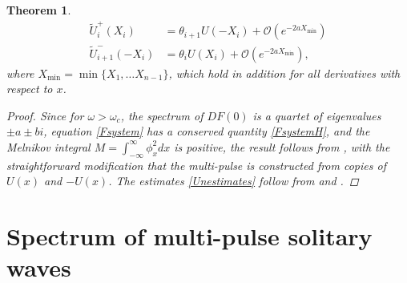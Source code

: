 \documentclass[12pt]{article}
\newtheorem{theorem}{Theorem}
\begin{document}
\begin{theorem}
\begin{equation}
\begin{aligned}
\tilde{U}_i^+(X_i) &= \theta_{i+1} U(-X_i) + \mathcal{O}(e^{-2 a X_{\min}}) \\
\tilde{U}_{i+1}^-(-X_i) &= \theta_i U(X_i) + \mathcal{O}(e^{-2 a X_{\min}}),
\end{aligned}
\end{equation}
where $X_{\mathrm{min}} = \min \{ X_1, \dots X_{n-1} \}$, which hold in addition for all derivatives with respect to $x$.
\begin{proof}
Since for $\omega > \omega_c$, the spectrum of $DF(0)$ is a quartet of eigenvalues $\pm a \pm b i$, equation \cref{Fsystem} has a conserved quantity \cref{FsystemH}, and the Melnikov integral $M = \int_{-\infty}^\infty \phi_x^2 dx$ is positive, the result follows from \cite[Theorem~3.6]{SandstedeStrut}, with the straightforward modification that the multi-pulse is constructed from copies of $U(x)$ and $-U(x)$. The estimates \cref{Unestimates} follow from \cite{Sandstede1993} and \cite{Sandstede1998}.
\end{proof}
\end{theorem}

\section{Spectrum of multi-pulse solitary waves}\label{sec:multieig}
\end{document}
